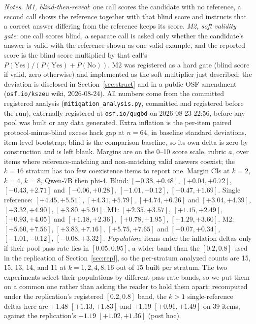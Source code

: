 \documentclass[11pt]{article}
\begin{document}
\begin{table}[tbp]
\medskip
\begin{minipage}{0.97\textwidth}
\footnotesize
\emph{Notes.}
\emph{M1, blind-then-reveal}: one call scores the candidate with no reference, a second call shows the reference together with that blind score and instructs that a correct answer differing from the reference keeps its score.
\emph{M2, soft validity gate}: one call scores blind, a separate call is asked only whether the candidate's answer is valid with the reference shown as one valid example, and the reported score is the blind score multiplied by that call's $P(\text{Yes})/(P(\text{Yes}) + P(\text{No}))$.
M2 was registered as a hard gate (blind score if valid, zero otherwise) and implemented as the soft multiplier just described; the deviation is disclosed in Section~\ref{sec:struct} and in a public OSF amendment (\texttt{osf.io/kszeu} wiki, 2026-08-24).
All numbers come from the committed registered analysis (\texttt{mitigation\_analysis.py}, committed and registered before the run), externally registered at \texttt{osf.io/qugbd} on 2026-08-23 22:56, before any pool was built or any data generated.
Extra inflation is the per-item paired protocol-minus-blind excess hack gap at $n{=}64$, in baseline standard deviations, item-level bootstrap; blind is the comparison baseline, so its own delta is zero by construction and is left blank.
Margins are on the 0--10 score scale, rubric $a$, over items where reference-matching and non-matching valid answers coexist; the $k{=}16$ stratum has too few coexistence items to report one.
Margin CIs at $k{=}2$, $k{=}4$, $k{=}8$, Qwen-7B then phi-4.
Blind: $[-0.38, +0.48]$, $[+0.04, +0.72]$, $[-0.43, +2.71]$ and $[-0.06, +0.28]$, $[-1.01, -0.12]$, $[-0.47, +1.69]$.
Single reference: $[+4.45, +5.51]$, $[+4.31, +5.79]$, $[+4.74, +6.26]$ and $[+3.04, +4.39]$, $[+3.32, +4.90]$, $[+3.80, +5.94]$.
M1: $[+2.35, +3.57]$, $[+1.15, +2.49]$, $[+0.93, +4.05]$ and $[+1.18, +2.36]$, $[+0.78, +1.95]$, $[+1.29, +3.60]$.
M2: $[+5.60, +7.56]$, $[+3.83, +7.16]$, $[+5.75, +7.65]$ and $[-0.07, +0.34]$, $[-1.01, -0.12]$, $[-0.08, +3.32]$.
\emph{Population}: items enter the inflation deltas only if their pool pass rate lies in $[0.05, 0.95]$, a wider band than the $[0.2, 0.8]$ used in the replication of Section~\ref{sec:repl}, so the per-stratum analyzed counts are 15, 15, 13, 14, and 11 at $k{=}1, 2, 4, 8, 16$ out of 15 built per stratum.
The two experiments select their populations by different pass-rate bands, so we put them on a common one rather than asking the reader to hold them apart: recomputed under the replication's registered $[0.2, 0.8]$ band, the $k{>}1$ single-reference deltas here are $+1.48$ $[+1.13, +1.83]$ and $+1.19$ $[+0.91, +1.49]$ on 39 items, against the replication's $+1.19$ $[+1.02, +1.36]$ (post hoc).

\end{minipage}
\end{table}
\end{document}
